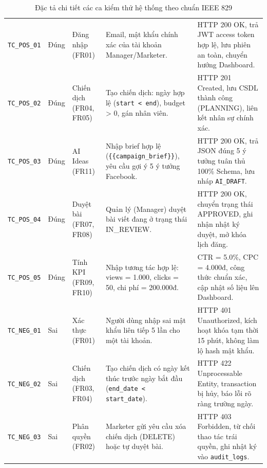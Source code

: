 \begin{table}[H]
\centering
{}
\fontsize{8.8pt}{10.8pt}\selectfont
\caption{Đặc tả chi tiết các ca kiểm thử hệ thống theo chuẩn IEEE 829}
\label{tab:v8-testcases-detail}
\renewcommand{\arraystretch}{1.02}
\begin{tabularx}{\textwidth}{|C{1.6cm}|C{1.1cm}|L{2.0cm}|Y|Y|}
\hline
{} &  &  &  & \\
\hline
\texttt{TC\_POS\_01} & Đúng & Đăng nhập (FR01) & Email, mật khẩu chính xác của tài khoản Manager/Marketer. & HTTP 200 OK, trả JWT access token hợp lệ, lưu phiên an toàn, chuyển hướng Dashboard.\\
\hline
\texttt{TC\_POS\_02} & Đúng & Chiến dịch (FR04, FR05) & Tạo chiến dịch: ngày hợp lệ (\texttt{start < end}), budget > 0, gán nhân viên. & HTTP 201 Created, lưu CSDL thành công (PLANNING), liên kết nhân sự chính xác.\\
\hline
\texttt{TC\_POS\_03} & Đúng & AI Ideas (FR11) & Nhập brief hợp lệ (\texttt{\{\{campaign\_brief\}\}}), yêu cầu gợi ý 5 ý tưởng Facebook. & HTTP 200 OK, trả JSON đúng 5 ý tưởng tuân thủ 100\% Schema, lưu nháp \texttt{AI\_DRAFT}.\\
\hline
\texttt{TC\_POS\_04} & Đúng & Duyệt bài (FR07, FR08) & Quản lý (Manager) duyệt bài viết đang ở trạng thái IN\_REVIEW. & HTTP 200 OK, chuyển trạng thái APPROVED, ghi nhận nhật ký duyệt, mở khóa lịch đăng.\\
\hline
\texttt{TC\_POS\_05} & Đúng & Tính KPI (FR09, FR10) & Nhập tương tác hợp lệ: views = 1.000, clicks = 50, chi phí = 200.000đ. & CTR = 5.0\%, CPC = 4.000đ, công thức chuẩn xác, cập nhật số liệu lên Dashboard.\\
\hline
\texttt{TC\_NEG\_01} & Sai & Xác thực (FR01) & Người dùng nhập sai mật khẩu liên tiếp 5 lần cho một tài khoản. & HTTP 401 Unauthorized, kích hoạt khóa tạm thời 15 phút, không làm lộ hash mật khẩu.\\
\hline
\texttt{TC\_NEG\_02} & Sai & Chiến dịch (FR03, FR04) & Tạo chiến dịch có ngày kết thúc trước ngày bắt đầu (\texttt{end\_date < start\_date}). & HTTP 422 Unprocessable Entity, transaction bị hủy, báo lỗi rõ ràng trường ngày.\\
\hline
\texttt{TC\_NEG\_03} & Sai & Phân quyền (FR02) & Marketer gửi yêu cầu xóa chiến dịch (DELETE) hoặc tự duyệt bài. & HTTP 403 Forbidden, từ chối thao tác trái quyền, ghi nhật ký vào \texttt{audit\_logs}.\\
\hline

\end{tabularx}
\end{table}
